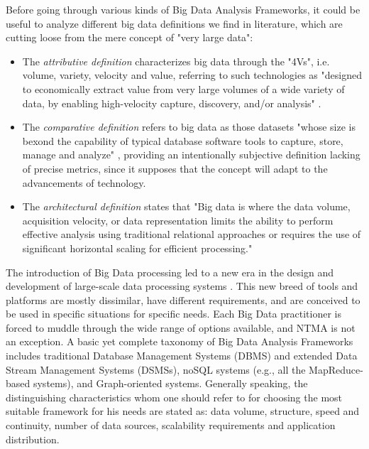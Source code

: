 \documentclass[10pt, conference, letterpaper]{IEEEtran}
\begin{document}
Before going through various kinds of Big Data Analysis Frameworks, it could be useful to analyze different big data definitions we find in literature, which are cutting loose from the mere concept of "very large data":
\begin{itemize}
\item The \textit{attributive definition} characterizes big data through the "4Vs", i.e. volume, variety, velocity and value, referring to such technologies as "designed to economically extract value from very large volumes of a wide variety of data, by enabling high-velocity capture, discovery, and/or analysis" \cite{gantz2011}.
\item The \textit{comparative definition} refers to big data as those datasets "whose size is bexond the capability of typical database software tools to capture, store, manage and analyze" \cite{MGI2011}, providing an intentionally subjective definition lacking of precise metrics, since it supposes that the concept will adapt to the advancements of technology.  
\item The \textit{architectural definition} states that "Big data is where the data volume, acquisition velocity, or data representation limits the ability to perform effective analysis using traditional relational approaches or requires the use of significant horizontal scaling for efficient processing." \cite{NIST2012}
\end{itemize}
The introduction of Big Data processing led to a new era in the design and development of large-scale data processing systems \cite{stonebraker2010}. This new breed of tools and platforms are mostly dissimilar, have different requirements, and are conceived to be used in specific situations for specific needs. Each Big Data practitioner is forced to muddle through the wide range of options available, and NTMA is not an exception. A basic yet complete taxonomy of Big Data Analysis Frameworks includes traditional Database Management Systems (DBMS) and extended Data Stream Management Systems (DSMSs), noSQL systems (e.g., all the MapReduce-based systems), and Graph-oriented systems.
Generally speaking, the distinguishing characteristics whom one should refer to for choosing the most suitable framework for his needs are stated as: data volume, structure, speed and continuity, number of data sources, scalability requirements and application distribution. 
\end{document}
